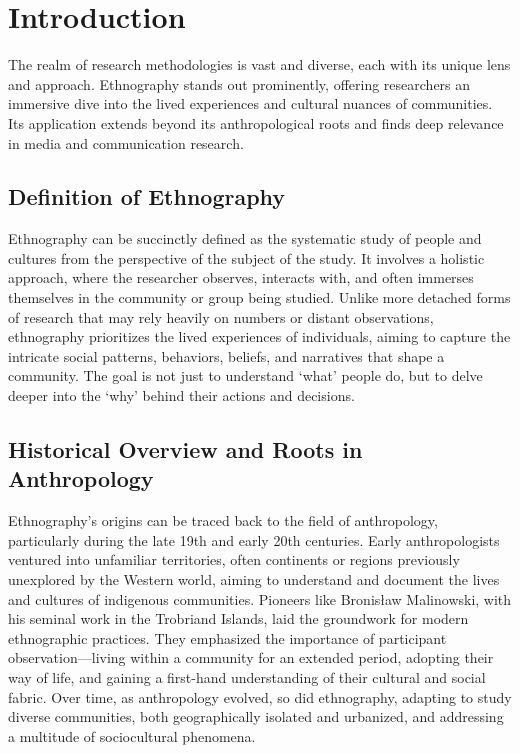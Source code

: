 \documentclass[
  b5paper]{book}
\begin{document}
\hypertarget{introduction-2}{%
\section{Introduction}\label{introduction-2}}

The realm of research methodologies is vast and diverse, each with its unique lens and approach. Ethnography stands out prominently, offering researchers an immersive dive into the lived experiences and cultural nuances of communities. Its application extends beyond its anthropological roots and finds deep relevance in media and communication research.

\hypertarget{definition-of-ethnography}{%
\subsection*{Definition of Ethnography}\label{definition-of-ethnography}}

Ethnography can be succinctly defined as the systematic study of people and cultures from the perspective of the subject of the study. It involves a holistic approach, where the researcher observes, interacts with, and often immerses themselves in the community or group being studied. Unlike more detached forms of research that may rely heavily on numbers or distant observations, ethnography prioritizes the lived experiences of individuals, aiming to capture the intricate social patterns, behaviors, beliefs, and narratives that shape a community. The goal is not just to understand `what' people do, but to delve deeper into the `why' behind their actions and decisions.

\hypertarget{historical-overview-and-roots-in-anthropology}{%
\subsection*{Historical Overview and Roots in Anthropology}\label{historical-overview-and-roots-in-anthropology}}

Ethnography's origins can be traced back to the field of anthropology, particularly during the late 19th and early 20th centuries. Early anthropologists ventured into unfamiliar territories, often continents or regions previously unexplored by the Western world, aiming to understand and document the lives and cultures of indigenous communities. Pioneers like Bronisław Malinowski, with his seminal work in the Trobriand Islands, laid the groundwork for modern ethnographic practices. They emphasized the importance of participant observation---living within a community for an extended period, adopting their way of life, and gaining a first-hand understanding of their cultural and social fabric. Over time, as anthropology evolved, so did ethnography, adapting to study diverse communities, both geographically isolated and urbanized, and addressing a multitude of sociocultural phenomena.
\end{document}
